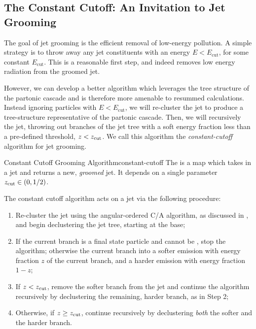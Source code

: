 \subsection{The Constant Cutoff: An Invitation to Jet Grooming}
\label{sec:constant-cutoff}

The goal of jet grooming is the efficient removal of low-energy pollution.
%
A simple strategy is to throw away any jet constituents with an energy \(E < E_\text{cut}\), for some constant \(E_\text{cut}\).
%
This is a reasonable first step, and indeed removes low energy radiation from the groomed jet.

However, we can develop a better algorithm which leverages the tree structure of the partonic cascade and is therefore more amenable to resummed calculations.
%
Instead ignoring particles with \(E < E_\text{cut}\), we will re-cluster the jet to produce a tree-structure representative of the partonic cascade.
%
Then, we will recursively  the jet, throwing out branches of the jet tree with a soft energy fraction less than a pre-defined threshold, \(z < z_{\rm cut}\).
%
We call this algorithm the \textit{\gls{constant-cutoff}} algorithm for jet grooming.


\begin{definitionbox}{Constant Cutoff Grooming Algorithm}{constant-cutoff}
    The  is a map which takes in a jet and returns a new, \textit{groomed} jet.
    It depends on a single parameter \(z_{\rm cut} \in (0, 1/2)\).

    The constant cutoff algorithm acts on a jet via the following procedure:
    \begin{enumerate}
        \item
            Re-cluster the jet using the angular-ordered C/A algorithm, as discussed in , and begin \gls{declustering} the jet tree, starting at the base;

        \item
            If the current branch is a final state particle and cannot be , stop the algorithm;
            otherwise  the current branch into a softer emission with energy fraction \(z\) of the current branch, and a harder emission with energy fraction \(1-z\);

        \item
            If \(z < z_{\rm cut}\), remove the softer branch from the jet and continue the algorithm recursively by declustering the remaining, harder branch, as in Step 2;

        \item
            Otherwise, if \(z \geq z_{\rm cut}\), continue recursively by \gls{declustering} \textit{both} the softer and the harder branch.
    \end{enumerate}
\end{definitionbox}

